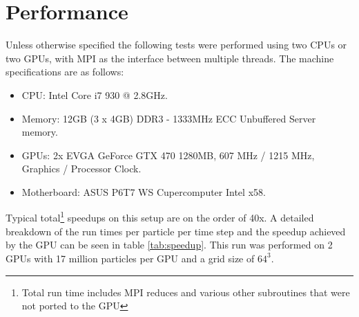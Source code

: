 \chapter{Performance}
\label{ch:performance} 
	Unless otherwise specified the following tests were performed using two CPUs or two GPUs, with MPI as the interface between multiple threads. The machine specifications are as follows:
\begin{itemize}
	\item CPU: Intel Core i7 930 @ 2.8GHz.
	\item Memory: 12GB (3 x 4GB) DDR3 - 1333MHz ECC Unbuffered Server memory. 
	\item GPUs: 2x EVGA GeForce GTX 470 1280MB, 607 MHz / 1215 MHz, Graphics / Processor Clock. 
	\item Motherboard: ASUS P6T7 WS Cupercomputer Intel x58.
\end{itemize}

Typical total\footnote[1]{Total run time includes MPI reduces and various other subroutines that were not ported to the GPU} speedups on this setup are on the order of 40x. A detailed breakdown of the run times per particle per time step and the speedup achieved by the GPU can be seen in table \ref{tab:speedup}. This run was performed on 2 GPUs with 17 million particles per GPU and a grid size of $64^3$.

